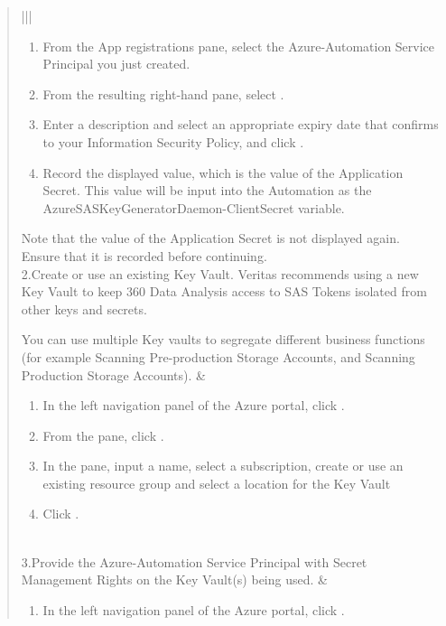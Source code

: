\documentclass[letterpaper,10pt,english]{sphinxmanual}
\begin{document}
\begin{quote}
\begin{savenotes}
\begin{tabular}[t]{|*{2}{|}}
\begin{enumerate}
\item {} 
From the App registrations pane, select the
Azure-Automation Service Principal you just created.

\item {} 
From the resulting right-hand pane, select .

\item {} 
Enter a description and select an appropriate expiry
date that confirms to your Information Security
Policy, and click .

\item {} 
Record the displayed value, which is the value of
the Application Secret. This value will be input
into the Automation as the
AzureSASKeyGeneratorDaemon-ClientSecret variable.

\end{enumerate}

Note that the value of the Application Secret is not
displayed again. Ensure that it is recorded before
continuing.
\\
\hline
2.Create or use an existing Key Vault.
Veritas recommends using a new Key
Vault to keep 360 Data Analysis access
to SAS Tokens isolated from other keys
and secrets.

 You can use multiple Key
vaults to segregate different business
functions (for example Scanning
Pre-production Storage Accounts, and
Scanning Production Storage Accounts).
&\begin{enumerate}
\item {} 
In the left navigation panel of the Azure portal,
click .

\item {} 
From the  pane, click .

\item {} 
In the    pane, input a
name, select a subscription, create or use an existing
resource group and select a location for the Key Vault

\item {} 
Click .

\end{enumerate}
\\
\hline
3.Provide the Azure-Automation Service
Principal with Secret Management Rights
on the Key Vault(s) being used.
&\begin{enumerate}
\item {} 
In the left navigation panel of the Azure portal,
click .


\end{enumerate}
\end{tabular}
\end{savenotes}
\end{quote}
\end{document}
